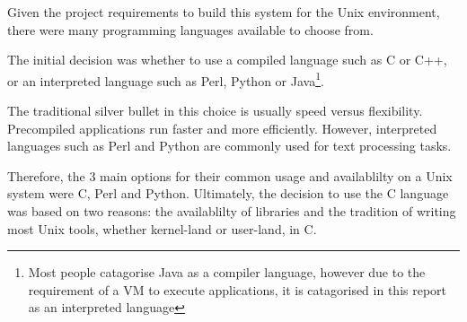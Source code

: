 
Given the project requirements to build this system for the Unix
environment, there were many programming languages available to choose
from.


The initial decision was whether to use a compiled language such as C or
C++, or an interpreted language such as Perl, Python or
Java\footnote{Most people catagorise Java as a compiler language,
however due to the requirement of a VM to execute applications, it is
catagorised in this report as an interpreted language}. 


The traditional silver bullet in this choice is usually speed versus 
flexibility. Precompiled applications run faster and more efficiently. 
However, interpreted languages such as Perl and Python are commonly
used for text processing tasks. 


Therefore, the 3 main options for their common usage and availablilty 
on a Unix system were C, Perl and Python. Ultimately, the decision to 
use the C language was based on two reasons: the availablilty of 
libraries and the tradition of writing most Unix tools, whether 
kernel-land or user-land, in C.
